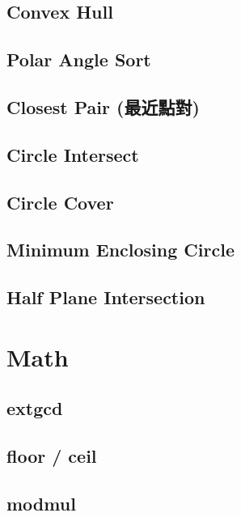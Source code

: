 \subsection{Convex Hull}

\subsection{Polar Angle Sort}

\subsection{Closest Pair (最近點對)}

\subsection{Circle Intersect}

\subsection{Circle Cover}

\subsection{Minimum Enclosing Circle}

% 
\subsection{Half Plane Intersection}


\section{Math}
\subsection{extgcd}

\subsection{floor / ceil}

\subsection{modmul}


